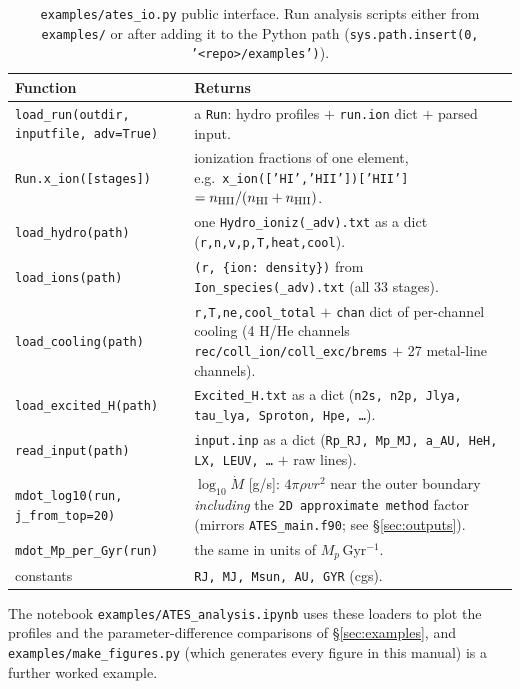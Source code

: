 \documentclass[english,a4paper]{kiseon_memo}
\begin{document}
\begin{table}[htbp]\centering\small
\begin{tabular}{@{}lp{8.6cm}@{}}
\toprule
Function & Returns \\
\midrule
\texttt{load\_run(outdir, inputfile, adv=True)} & a \texttt{Run}: hydro
  profiles $+$ \texttt{run.ion} dict $+$ parsed input. \\
\texttt{Run.x\_ion([stages])} & ionization fractions of one element, e.g.\
  \texttt{x\_ion(['HI','HII'])['HII']} $= n_{\rm HII}/(n_{\rm HI}+n_{\rm HII})$. \\
\texttt{load\_hydro(path)} & one \texttt{Hydro\_ioniz(\_adv).txt} as a dict
  (\texttt{r,n,v,p,T,heat,cool}). \\
\texttt{load\_ions(path)} & \texttt{(r, \{ion: density\})} from
  \texttt{Ion\_species(\_adv).txt} (all 33 stages). \\
\texttt{load\_cooling(path)} & \texttt{r,T,ne,cool\_total} $+$
  \texttt{chan} dict of per-channel cooling (4 H/He channels
  \texttt{rec/coll\_ion/coll\_exc/brems} $+$ 27 metal-line channels). \\
\texttt{load\_excited\_H(path)} & \texttt{Excited\_H.txt} as a dict
  (\texttt{n2s, n2p, Jlya, tau\_lya, Sproton, Hpe, \ldots}). \\
\texttt{read\_input(path)} & \texttt{input.inp} as a dict
  (\texttt{Rp\_RJ, Mp\_MJ, a\_AU, HeH, LX, LEUV, \ldots} $+$ raw lines). \\
\texttt{mdot\_log10(run, j\_from\_top=20)} & $\log_{10}\dot M$ [g/s]:
  $4\pi\rho v r^2$ near the outer boundary \emph{including} the
  \texttt{2D approximate method} factor (mirrors \texttt{ATES\_main.f90};
  see \S\ref{sec:outputs}). \\
\texttt{mdot\_Mp\_per\_Gyr(run)} & the same in units of $M_p$\,Gyr$^{-1}$. \\
constants & \texttt{RJ, MJ, Msun, AU, GYR} (cgs). \\
\bottomrule
\end{tabular}
\caption{\texttt{examples/ates\_io.py} public interface. Run analysis scripts
either from \texttt{examples/} or after adding it to the Python path
(\texttt{sys.path.insert(0, '<repo>/examples')}).}
\label{tab:atesio}
\end{table}

The notebook \texttt{examples/}\allowbreak\texttt{ATES\_analysis.ipynb}
uses these loaders to plot the profiles and the parameter-difference
comparisons of \S\ref{sec:examples}, and
\texttt{examples/make\_figures.py} (which generates every figure in this
manual) is a further worked example.
\end{document}
